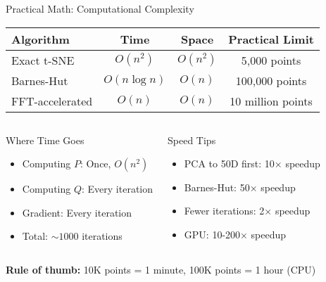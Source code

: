 \documentclass[aspectratio=169]{beamer}
\begin{document}
\begin{frame}{Practical Math: Computational Complexity}
\begin{center}
\begin{tabular}{l|c|c|c}
\textbf{Algorithm} & \textbf{Time} & \textbf{Space} & \textbf{Practical Limit} \\
\hline
\hline
Exact t-SNE & $O(n^2)$ & $O(n^2)$ & 5,000 points \\
Barnes-Hut & $O(n \log n)$ & $O(n)$ & 100,000 points \\
FFT-accelerated & $O(n)$ & $O(n)$ & 10 million points \\
\hline
\end{tabular}
\end{center}

\vspace{5mm}
\begin{columns}
\begin{block}{Where Time Goes}
\begin{itemize}
\item Computing $P$: Once, $O(n^2)$
\item Computing $Q$: Every iteration
\item Gradient: Every iteration
\item Total: $\sim 1000$ iterations
\end{itemize}
\end{block}

\begin{block}{Speed Tips}
\begin{itemize}
\item PCA to 50D first: 10× speedup
\item Barnes-Hut: 50× speedup
\item Fewer iterations: 2× speedup
\item GPU: 10-200× speedup
\end{itemize}
\end{block}
\end{columns}

\vspace{3mm}
\begin{center}
\colorbox{yellow!20}{\parbox{0.85\textwidth}{\centering
\textbf{Rule of thumb:} 10K points = 1 minute, 100K points = 1 hour (CPU)}}
\end{center}
\end{frame}
\end{document}
